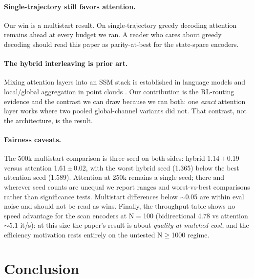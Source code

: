 \documentclass[11pt]{article}
\begin{document}
\paragraph{Single-trajectory still favors attention.}
Our win is a multistart result. On single-trajectory greedy decoding attention
remains ahead at every budget we ran. A reader who cares about greedy decoding
should read this paper as parity-at-best for the state-space encoders.

\paragraph{The hybrid interleaving is prior art.}
Mixing attention layers into an SSM stack is established in language models
\citep{jamba2024,zamba2024} and local/global aggregation in point clouds
\citep{pillarmamba2025}. Our contribution is the RL-routing evidence and the
contrast we can draw because we ran both: one \emph{exact} attention layer works
where two pooled global-channel variants did not. That contrast, not the
architecture, is the result.

\paragraph{Fairness caveats.}
The 500k multistart comparison is three-seed on both sides: hybrid
1.14\,$\pm$\,0.19 versus attention 1.61\,$\pm$\,0.02, with the worst hybrid seed
(1.365) below the best attention seed (1.589). Attention at 250k remains a
single seed; there and wherever seed counts are unequal we report ranges and
worst-vs-best comparisons rather than significance tests. Multistart differences below
$\sim$0.05 are within eval noise and should not be read as wins. Finally, the
throughput table shows no speed advantage for the scan encoders at N$=$100
(bidirectional 4.78 vs attention $\sim$5.1 it/s): at this size the paper's
result is about \emph{quality at matched cost}, and the efficiency motivation
rests entirely on the untested N$\geq$1000 regime.

\section{Conclusion}
\label{sec:conclusion}
\end{document}
